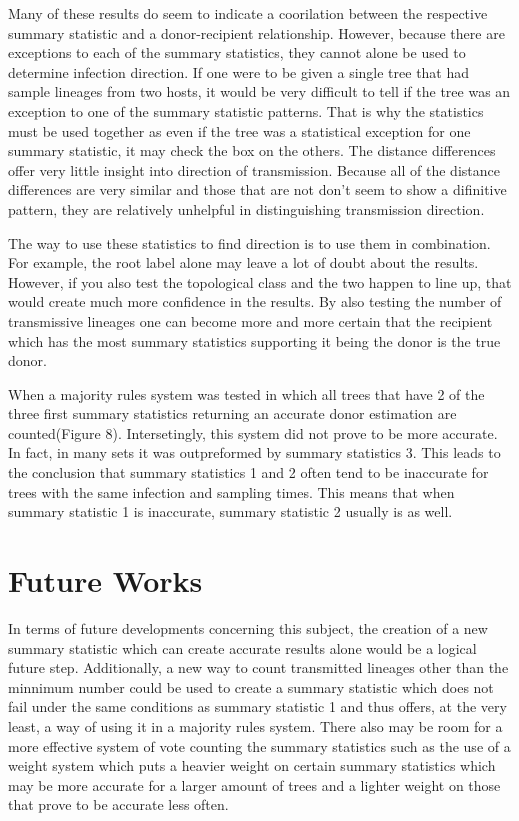 \documentclass[final,5p,times,twocolumn,authoryear]{elsarticle}
\begin{document}
Many of these results do seem to indicate a coorilation between the respective summary statistic and a donor-recipient relationship. However, because there are exceptions to each of the summary statistics, they cannot alone be used to determine infection direction. If one were to be given a single tree that had sample lineages from two hosts, it would be very difficult to tell if the tree was an exception to one of the summary statistic patterns. That is why the statistics must be used together as even if the tree was a statistical exception for one summary statistic, it may check the box on the others. The distance differences offer very little insight into direction of transmission. Because all of the distance differences are very similar and those that are not don't seem to show a difinitive pattern, they are relatively unhelpful in distinguishing transmission direction.

The way to use these statistics to find direction is to use them in combination. For example, the root label alone may leave a lot of doubt about the results. However, if you also test the topological class and the two happen to line up, that would create much more confidence in the results. By also testing the number of transmissive lineages one can become more and more certain that the recipient which has the most summary statistics supporting it being the donor is the true donor.

When a majority rules system was tested in which all trees that have 2 of the three first summary statistics returning an accurate donor estimation are counted(Figure 8). Intersetingly, this system did not prove to be more accurate. In fact, in many sets it was outpreformed by summary statistics 3. This leads to the conclusion that summary statistics 1 and 2 often tend to be inaccurate for trees with the same infection and sampling times. This means that when summary statistic 1 is inaccurate, summary statistic 2 usually is as well.

\section{Future Works}
\label{Future Works}
In terms of future developments concerning this subject, the creation of a new summary statistic which can create accurate results alone would be a logical future step. Additionally, a new way to count transmitted lineages other than the minnimum number could be used to create a summary statistic which does not fail under the same conditions as summary statistic 1 and thus offers, at the very least, a way of using it in a majority rules system. There also may be room for a more effective system of vote counting the summary statistics such as the use of a weight system which puts a heavier weight on certain summary statistics which may be more accurate for a larger amount of trees and a lighter weight on those that prove to be accurate less often.
\end{document}
